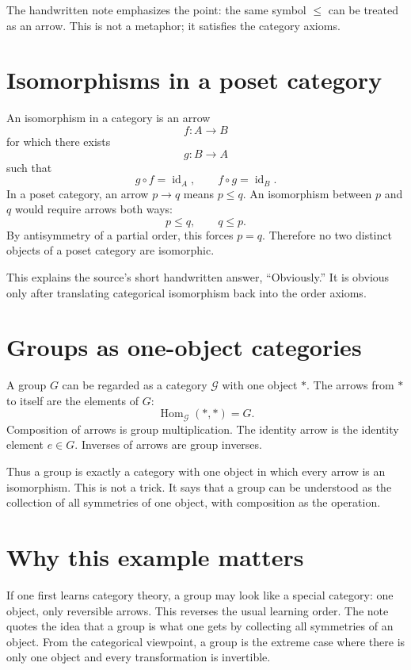 The handwritten note emphasizes the point: the same symbol $\le$ can be treated as an arrow.  This is not a metaphor; it satisfies the category axioms.

\section{Isomorphisms in a poset category}

An isomorphism in a category is an arrow
\[
  f:A\to B
\]
for which there exists
\[
  g:B\to A
\]
such that
\[
  g\circ f=\operatorname{id}_A,\qquad
  f\circ g=\operatorname{id}_B.
\]
In a poset category, an arrow $p\to q$ means $p\le q$.  An isomorphism between $p$ and $q$ would require arrows both ways:
\[
  p\le q,\qquad q\le p.
\]
By antisymmetry of a partial order, this forces $p=q$.  Therefore no two distinct objects of a poset category are isomorphic.

This explains the source's short handwritten answer, “Obviously.”  It is obvious only after translating categorical isomorphism back into the order axioms.

\section{Groups as one-object categories}

A group $G$ can be regarded as a category $\mathcal G$ with one object $*$.  The arrows from $*$ to itself are the elements of $G$:
\[
  \operatorname{Hom}_{\mathcal G}(*,*)=G.
\]
Composition of arrows is group multiplication.  The identity arrow is the identity element $e\in G$.  Inverses of arrows are group inverses.

Thus a group is exactly a category with one object in which every arrow is an isomorphism.  This is not a trick.  It says that a group can be understood as the collection of all symmetries of one object, with composition as the operation.

\section{Why this example matters}

If one first learns category theory, a group may look like a special category: one object, only reversible arrows.  This reverses the usual learning order.  The note quotes the idea that a group is what one gets by collecting all symmetries of an object.  From the categorical viewpoint, a group is the extreme case where there is only one object and every transformation is invertible.

